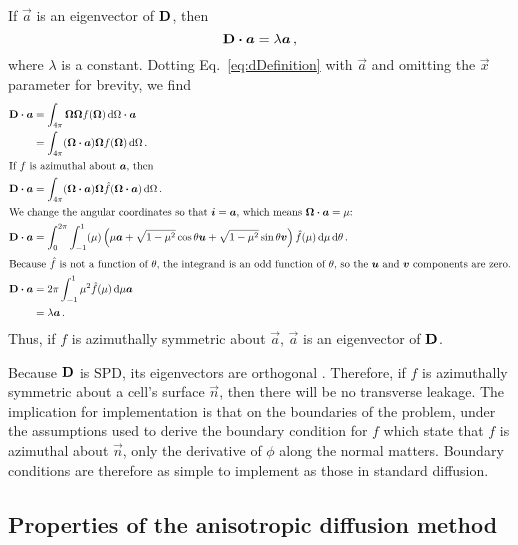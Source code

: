 If $\vec{a}$ is an eigenvector of $\mathbf{D}$, then
\begin{equation*}
  \mathbf{D} \bm{\cdot} \bm{a} = \lambda \bm{a}\,,
\end{equation*}
where $\lambda$ is a constant. Dotting Eq.~\eqref{eq:dDefinition} with
$\vec{a}$ and omitting the $\vec{x}$ parameter for brevity, we find
\begin{align*}
  \mathbf{D} \bm{\cdot} \bm{a}
  &= \int_{4\pi} \bm{\Omega} \bm{\Omega} f(\bm{\Omega}) \mathop{}\!\mathrm{d}\Omega \bm{\cdot} \bm{a}
  \\
  &= \int_{4\pi} (\bm{\Omega} \bm{\cdot} \bm{a}) \bm{\Omega} f(\bm{\Omega}) \mathop{}\!\mathrm{d}\Omega
  \,.
  \\ 
  \intertext{If $f$ is azimuthal about $\bm{a}$, then}
  \mathbf{D} \bm{\cdot} \bm{a}
  &= \int_{4\pi} (\bm{\Omega} \bm{\cdot} \bm{a}) \bm{\Omega}
    \hat f(\bm{\Omega} \bm{\cdot} \bm{a}) \mathop{}\!\mathrm{d}\Omega \,.
  \\ 
  \intertext{We change the angular coordinates so that $\bm{i}=\bm{a}$, which
  means $\bm{\Omega} \bm{\cdot} \bm{a}=\mu$:}
  \mathbf{D} \bm{\cdot} \bm{a}
  &= \int_{0}^{2\pi} \int_{-1}^{1} (\mu)
  \left( \mu \bm{a} + \sqrt{1-\mu^2} \cos \theta \bm{u} + \sqrt{1-\mu^2} \sin
  \theta \bm{v} \right) \hat f(\mu) \mathop{}\!\mathrm{d}\mu \mathop{}\!\mathrm{d}\theta \,.
\\ 
\intertext{Because $\hat f$ is not a function of $\theta$, the integrand is an
odd function of $\theta$, so the $\bm{u}$ and $\bm{v}$ components are zero.}
  \mathbf{D} \bm{\cdot} \bm{a}
  &= 2\pi \int_{-1}^{1} \mu^2 \hat f(\mu) \mathop{}\!\mathrm{d}\mu \bm{a}
  \\
  &= \lambda \bm{a} \,.
\end{align*}
Thus, if $f$ is azimuthally symmetric about $\vec{a}$, $\vec{a}$ is an
eigenvector of $\mathbf{D}$.

Because $\mathbf{D}$ is SPD, its eigenvectors are orthogonal \cite[p.173]{Tre1997}.
Therefore, if $f$ is azimuthally symmetric about a cell's surface $\vec{n}$,
then there will be no transverse leakage. The implication for implementation
is that on the boundaries of the problem, under the assumptions used to derive
the boundary condition for $f$ which state that $f$ is azimuthal about
$\vec{n}$, only the derivative of $\phi$ along the normal matters. Boundary
conditions are therefore as simple to implement as those in standard diffusion.

\subsection{Properties of the anisotropic diffusion method}

